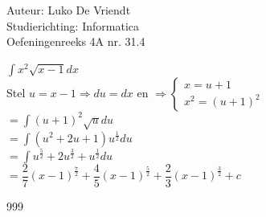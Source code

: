 \documentclass[a4paper]{article}
\begin{document}
\noindent \large Auteur: Luko De Vriendt\\
\noindent \large Studierichting: Informatica\\
\noindent \large Oefeningenreeks 4A nr. 31.4\\

\medskip

\normalsize

$\displaystyle \int x^2 \sqrt{x-1}dx$ \\

Stel $u = x- 1 \Rightarrow du = dx$ en $
\Rightarrow
\left \{
\begin{array}{l}
     x = u + 1 \\
     x^2 = (u + 1)^2
\end{array}
\right .$ \\

$= \displaystyle \int (u+1) ^ 2 \sqrt{u}du$ \\

$= \displaystyle \int \left( u^2 + 2u + 1\right)u^{\tfrac{1}{2}}du$ \\

$= \displaystyle \int u^{\tfrac{5}{2}} + 2u^{\tfrac{3}{2}} + u^{\tfrac{1}{2}}du$ \\

$= \dfrac{2}{7} (x-1)^{\tfrac{7}{2}} + \dfrac{4}{5} (x-1)^{\tfrac{5}{2}} + \dfrac{2}{3} (x-1)^{\tfrac{3}{2}} + c$ \\

\begin{thebibliography}{999}
\end{thebibliography}
\end{document}

